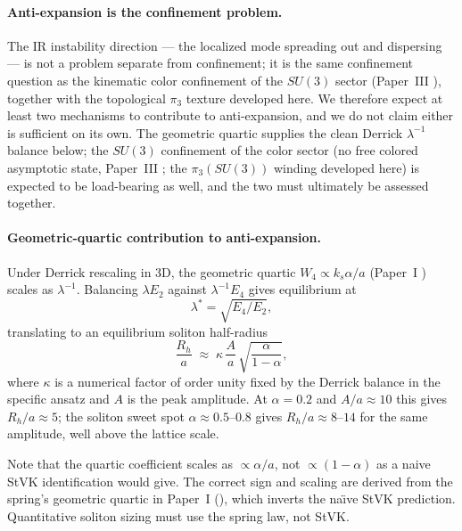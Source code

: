 \paragraph{Anti-expansion is the confinement problem.}
The IR instability direction --- the localized mode spreading out and dispersing --- is not a
problem separate from confinement; it is the same confinement question as the kinematic color
confinement of the $SU(3)$ sector (Paper~III ), together with the
topological $\pi_3$ texture developed here.
We therefore expect at least two mechanisms to contribute to anti-expansion, and we do not claim
either is sufficient on its own. The geometric quartic supplies the clean Derrick $\lambda^{-1}$
balance below; the $SU(3)$ confinement of the color sector (no free colored asymptotic state,
Paper~III ; the $\pi_3(SU(3))$ winding developed here) is expected
to be load-bearing as well, and the two must ultimately be assessed together.

\paragraph{Geometric-quartic contribution to anti-expansion.}
Under Derrick rescaling in 3D, the geometric quartic $W_4\propto k_s\alpha/a$ (Paper~I
) scales as $\lambda^{-1}$.
Balancing $\lambda E_2$ against $\lambda^{-1}E_4$ gives equilibrium at
\begin{equation}
  \lambda^* = \sqrt{E_4/E_2},
  \label{eq:derrick-balance}
\end{equation}
translating to an equilibrium soliton half-radius
\begin{equation}
  \frac{R_h}{a}
  \;\approx\;
  \kappa\,\frac{A}{a}\,\sqrt{\frac{\alpha}{1-\alpha}},
  \label{eq:derrick-radius}
\end{equation}
where $\kappa$ is a numerical factor of order unity fixed by the Derrick balance in the specific
ansatz and $A$ is the peak amplitude.
At $\alpha=0.2$ and $A/a\approx 10$ this gives $R_h/a\approx 5$; the soliton sweet spot
$\alpha\approx 0.5$--$0.8$ gives $R_h/a\approx 8$--$14$ for the same amplitude, well above the
lattice scale.

Note that the quartic coefficient scales as $\propto\alpha/a$, not $\propto(1-\alpha)$ as a naive
StVK identification would give.
The correct sign and scaling are derived from the spring's geometric quartic in Paper~I
(), which inverts the na\"\i ve StVK prediction.
Quantitative soliton sizing must use the spring law, not StVK.

